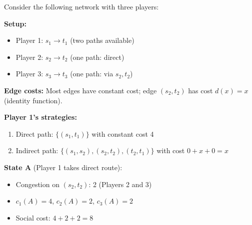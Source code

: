 \begin{exbox}
Consider the following network with three players:

\begin{center}
\end{center}

\textbf{Setup:}
\begin{itemize}
  \item Player 1: $s_1 \to t_1$ (two paths available)
  \item Player 2: $s_2 \to t_2$ (one path: direct)
  \item Player 3: $s_3 \to t_3$ (one path: via $s_2, t_2$)
\end{itemize}

\textbf{Edge costs:} Most edges have constant cost; edge $(s_2, t_2)$ has cost $d(x) = x$ (identity function).

\textbf{Player 1's strategies:}
\begin{enumerate}
  \item Direct path: $\{(s_1, t_1)\}$ with constant cost 4
  \item Indirect path: $\{(s_1, s_2), (s_2, t_2), (t_2, t_1)\}$ with cost $0 + x + 0 = x$
\end{enumerate}

\textbf{State A} (Player 1 takes direct route):
\begin{itemize}
  \item Congestion on $(s_2, t_2)$: 2 (Players 2 and 3)
  \item $c_1(A) = 4$, \quad $c_2(A) = 2$, \quad $c_3(A) = 2$
  \item Social cost: $4 + 2 + 2 = 8$
\end{itemize}


\end{exbox}
